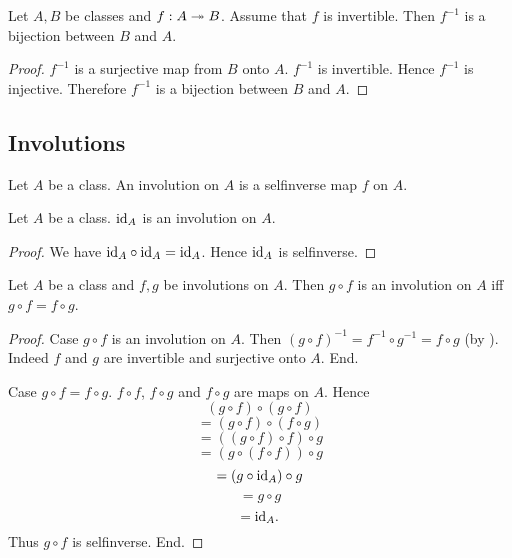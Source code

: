 \documentclass[10pt]{article}
\begin{document}
  \begin{forthel}
    \begin{corollary}
      Let $A, B$ be classes and $f : A \twoheadrightarrow B$.
      Assume that $f$ is invertible.
      Then $f^{-1}$ is a bijection between $B$ and $A$.
    \end{corollary}
    \begin{proof}
      $f^{-1}$ is a surjective map from $B$ onto $A$.
      $f^{-1}$ is invertible.
      Hence $f^{-1}$ is injective.
      Therefore $f^{-1}$ is a bijection between $B$ and $A$.
    \end{proof}
  \end{forthel}


  \subsection*{Involutions}

  \begin{forthel}
    \begin{definition}
      Let $A$ be a class.
      An involution on $A$ is a selfinverse map $f$ on $A$.
    \end{definition}
  \end{forthel}

  \begin{forthel}
    \begin{proposition}
      Let $A$ be a class.
      $\textrm{id}_{A}$ is an involution on $A$.
    \end{proposition}
    \begin{proof}
      We have $\textrm{id}_{A} \circ \textrm{id}_{A} = \textrm{id}_{A}$.
      Hence $\textrm{id}_{A}$ is selfinverse.
    \end{proof}
  \end{forthel}

  \begin{forthel}
    \begin{proposition}
      Let $A$ be a class and $f, g$ be involutions on $A$.
      Then $g \circ f$ is an involution on $A$ iff $g \circ f = f \circ g$.
    \end{proposition}
    \begin{proof}
      Case $g \circ f$ is an involution on $A$.
        Then $(g \circ f)^{-1}
          = f^{-1} \circ g^{-1}
          = f \circ g$
        (by ).
        Indeed $f$ and $g$ are invertible and surjective onto $A$.
      End.

      Case $g \circ f = f \circ g$.
        $f \circ f$, $f \circ g$ and $f \circ g$ are maps on $A$.
        Hence
        \[  (g \circ f) \circ (g \circ f)       \]
        \[    = (g \circ f) \circ (f \circ g)   \]
        \[    = ((g \circ f) \circ f) \circ g   \]
        \[    = (g \circ (f \circ f)) \circ g   \]
        \[    = (g \circ \textrm{id}_{A}) \circ g       \]
        \[    = g \circ g                       \]
        \[    = \textrm{id}_{A}.                        \]
        Thus $g \circ f$ is selfinverse.
      End.
    \end{proof}
  \end{forthel}
\end{document}
